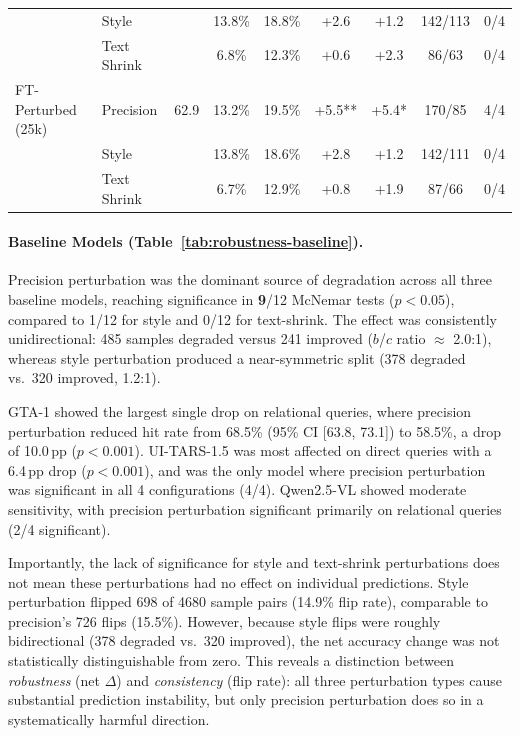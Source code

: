\begin{table}[ht]
\begin{tabular}{llc cc cc cc}
 & Style &  & 13.8\% & 18.8\% & +2.6 & +1.2 & 142/113 & 0/4 \\
 & Text Shrink &  & 6.8\% & 12.3\% & +0.6 & +2.3 & 86/63 & 0/4 \\
\midrule
FT-Perturbed (25k) & Precision & 62.9 & 13.2\% & 19.5\% & +5.5** & +5.4* & 170/85 & 4/4 \\
 & Style &  & 13.8\% & 18.6\% & +2.8 & +1.2 & 142/111 & 0/4 \\
 & Text Shrink &  & 6.7\% & 12.9\% & +0.8 & +1.9 & 87/66 & 0/4 \\
\bottomrule
\end{tabular}
\end{table}

\paragraph{Baseline Models (Table~\ref{tab:robustness-baseline}).}
Precision perturbation was the dominant source of degradation across all three baseline models, reaching significance in {\bfseries 9}/12 McNemar tests ($p < 0.05$), compared to 1/12 for style and 0/12 for text-shrink. The effect was consistently unidirectional: 485 samples degraded versus 241 improved ($b$/$c$ ratio $\approx$ 2.0:1), whereas style perturbation produced a near-symmetric split (378 degraded vs.\ 320 improved, 1.2:1).

GTA-1 showed the largest single drop on relational queries, where precision perturbation reduced hit rate from 68.5\% (95\% CI [63.8, 73.1]) to 58.5\%, a drop of 10.0\,pp ($p < 0.001$). 
UI-TARS-1.5 was most affected on direct queries with a 6.4\,pp drop ($p < 0.001$), and was the only model where precision perturbation was significant in all 4 configurations (4/4). 
Qwen2.5-VL showed moderate sensitivity, with precision perturbation significant primarily on relational queries (2/4 significant).

Importantly, the lack of significance for style and text-shrink perturbations does not mean these perturbations had no effect on individual predictions. Style perturbation flipped 698 of 4680 sample pairs (14.9\% flip rate), comparable to precision's 726 flips (15.5\%). However, because style flips were roughly bidirectional (378 degraded vs.\ 320 improved), the net accuracy change was not statistically distinguishable from zero. This reveals a distinction between \emph{robustness} (net $\Delta$) and \emph{consistency} (flip rate): all three perturbation types cause substantial prediction instability, but only precision perturbation does so in a systematically harmful direction.

